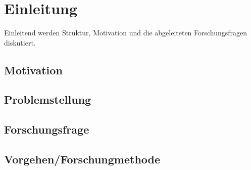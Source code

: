 \chapter{Einleitung}

Einleitend werden Struktur, Motivation und die abgeleiteten Forschungsfragen diskutiert.

\section{Motivation}
\Blindtext[1][3]

\section{Problemstellung}
\Blindtext[1][4]

\section{Forschungsfrage}
\Blindtext[1][4]

\section{Vorgehen/Forschungmethode}
\Blindtext[1][2]
